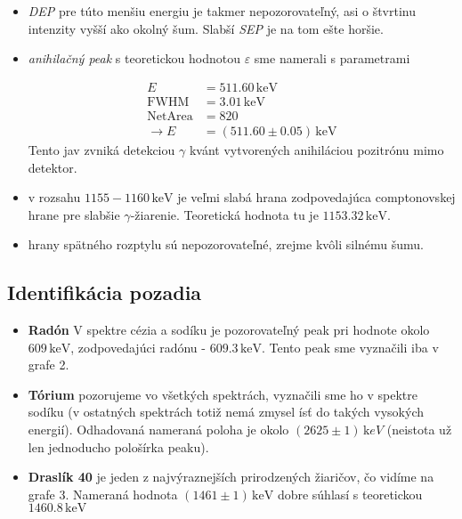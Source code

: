 \documentclass[a4paper, 10pt]{article}
\newcommand{\unit}[1]{\ensuremath{\, \mathrm{#1}}}
\begin{document}
\begin{itemize}
\item \textit{DEP} pre túto menšiu energiu je takmer nepozorovateľný, asi o štvrtinu intenzity vyšší ako okolný šum. Slabší \textit{SEP} je na tom ešte horšie.

\item \textit{anihilačný peak} s teoretickou hodnotou $\varepsilon$ sme namerali s parametrami

\begin{align*}
E &= 511.60\unit{keV}\\
\mathrm{FWHM} &= 3.01\unit{keV}\\
\mathrm{Net Area} &= 820\\
\rightarrow E &= (511.60\pm 0.05)\unit {keV}
\end{align*}
Tento jav zvniká detekciou $\gamma$ kvánt vytvorených anihiláciou pozitrónu mimo detektor.

\item v rozsahu $1155-1160 \unit{keV}$ je veľmi slabá hrana zodpovedajúca comptonovskej hrane pre slabšie $\gamma$-žiarenie. Teoretická hodnota tu je $1153.32\unit{keV}$.

\item hrany spätného rozptylu sú nepozorovateľné, zrejme kvôli silnému šumu.
\end{itemize}


\subsection*{Identifikácia pozadia}

\begin{itemize}
\item \textbf{Radón} V spektre cézia a sodíku je pozorovateľný peak pri hodnote okolo $609\unit{keV}$, zodpovedajúci radónu - $609.3\unit{keV}$. Tento peak sme vyznačili iba v grafe 2. 
\item \textbf{Tórium} pozorujeme vo všetkých spektrách, vyznačili sme ho v spektre sodíku (v ostatných spektrách totiž nemá zmysel ísť do takých vysokých energií). Odhadovaná nameraná poloha je okolo $(2625\pm 1)\unit keV$ (neistota už len jednoducho pološírka peaku). 
\item \textbf{Draslík 40} je jeden z najvýraznejších prirodzených žiaričov, čo vidíme na grafe 3. Nameraná hodnota $(1461\pm 1)\unit{keV}$ dobre súhlasí s teoretickou $1460.8\unit{keV}$
\end{itemize}

\end{document}
